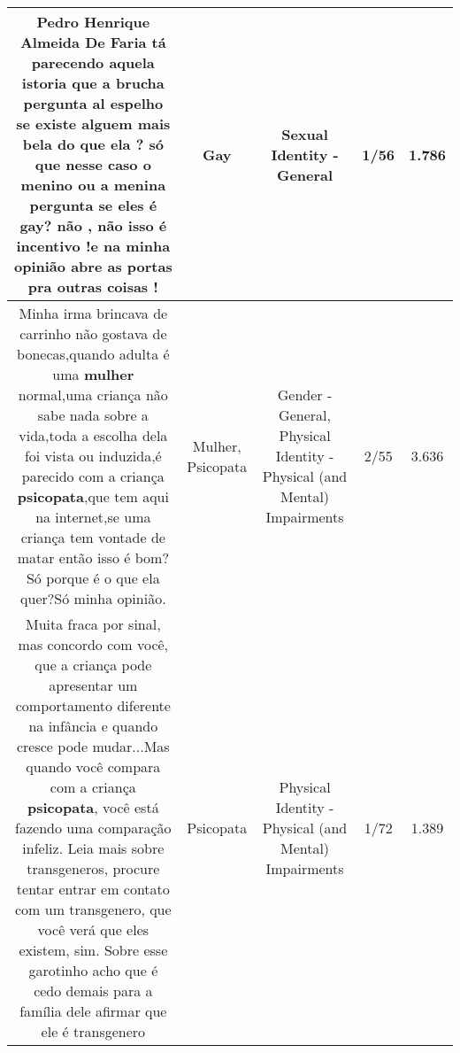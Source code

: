 \documentclass[11pt]{article}
\newlength\mylength
\begin{document}
\begin{center}
\begin{longtable}{|C{.65\mylength}|C{.30\mylength}|C{.12\mylength}|C{.12\mylength}|C{.12\mylength}|}
  \small Pedro Henrique Almeida De Faria tá parecendo aquela istoria que a brucha pergunta al espelho se existe alguem mais bela do que ela  ? só que nesse caso o menino ou a menina pergunta se eles é \textbf{gay}? não  , não  isso é incentivo !e na minha opinião abre as portas pra outras coisas !\normalsize   & Gay & Sexual Identity - General & 1/56 & 1.786 \\  \hline
  \small Minha irma brincava de carrinho não gostava de bonecas,quando adulta é uma \textbf{mulher} normal,uma criança não sabe nada sobre a vida,toda a escolha dela foi vista ou induzida,é parecido com a criança \textbf{psicopata},que tem aqui na internet,se uma criança tem vontade de matar então isso é bom?Só porque é o que ela quer?Só minha opinião.\normalsize   & Mulher, Psicopata & Gender - General, Physical Identity - Physical (and Mental) Impairments & 2/55 & 3.636 \\  \hline
  \small Muita fraca por sinal, mas concordo com você, que a criança pode apresentar um comportamento diferente na infância e quando cresce pode mudar...Mas quando você compara com a criança \textbf{psicopata}, você está fazendo uma comparação infeliz. Leia mais sobre transgeneros, procure tentar entrar em contato com um transgenero, que você verá que eles existem, sim. Sobre esse garotinho acho que é cedo demais para a família dele afirmar que ele é transgenero\normalsize   & Psicopata & Physical Identity - Physical (and Mental) Impairments & 1/72 & 1.389 \\  \hline

\end{longtable}
\end{center}
\end{document}
